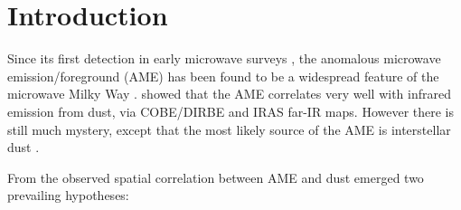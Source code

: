 \documentclass[preprint2,longabstract]{aastex}
\begin{document}
\begin{abstract}
\end{abstract}




\maketitle
\section{Introduction}

     Since its first detection in early microwave surveys , the anomalous microwave emission/foreground (AME) has been found to be a widespread feature of the microwave Milky Way \citep{dickinson13r}. \cite{kogut96,deoliveiracosta97,leitch98} showed that the AME correlates very well with infrared emission from dust, via COBE/DIRBE and IRAS far-IR maps. However there is still much mystery, except that the most likely source of the AME is interstellar dust \citep{ysard10a,tibbs11,hensley16}.

 From the observed spatial correlation between AME and dust emerged two prevailing hypotheses:
\end{document}
